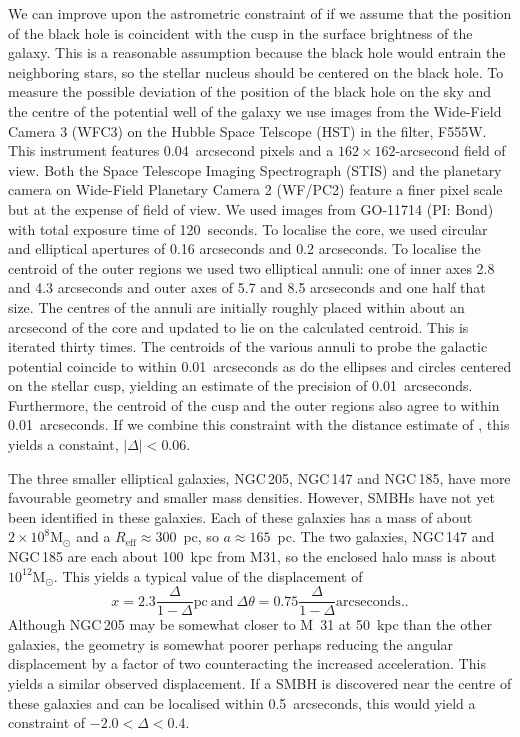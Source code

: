 \documentclass[useAMS,usenatbib]{mn2e}
\newcommand{\msun}{\mathrm{M}_\odot}
\begin{document}
We can improve upon the astrometric constraint of
\citet{2015arXiv150203231Y} if we assume that the position of the
black hole is coincident with the cusp in the surface brightness of
the galaxy.  This is a reasonable assumption because the black hole
would entrain the neighboring stars, so the stellar nucleus should be
centered on the black hole. To measure the possible deviation of the
position of the black hole on the sky and the centre of the potential
well of the galaxy we use images from the Wide-Field Camera 3 (WFC3)
on the Hubble Space Telscope (HST) in the filter, F555W.  This
instrument features 0.04~arcsecond pixels and a $162 \times
162$-arcsecond field of view.  Both the Space Telescope Imaging
Spectrograph (STIS) and the planetary camera on Wide-Field Planetary
Camera 2 (WF/PC2) feature a finer pixel scale but at the expense of
field of view.  We used images from GO-11714 (PI: Bond) with total
exposure time of 120~seconds.  To localise the core, we used circular
and elliptical apertures of 0.16 arcseconds and 0.2 arcseconds.  To
localise the centroid of the outer regions we used two elliptical
annuli: one of inner axes 2.8 and 4.3 arcseconds and outer axes of 5.7
and 8.5 arcseconds and one half that size.  The centres of the annuli
are initially roughly placed within about an arcsecond of the core and
updated to lie on the calculated centroid. This is iterated thirty
times.  The centroids of the various annuli to probe the galactic
potential coincide to within 0.01~arcseconds as do the ellipses and
circles centered on the stellar cusp, yielding an estimate of the
precision of 0.01~arcseconds.  Furthermore, the centroid of the cusp
and the outer regions also agree to within 0.01~arcseconds.  If we
combine this constraint with the distance estimate of
\citet{2006AJ....131.1405K}, this yields a constaint, $|\Delta|<
0.06$.

The three smaller elliptical galaxies, NGC\,205, NGC\,147 and NGC\,185,
have more favourable geometry and smaller mass densities.  However,
SMBHs have not yet been identified in these galaxies.  Each of these
galaxies has a mass of about $2 \times 10^8 \msun$ and a
$R_\mathrm{eff} \approx 300$~pc, so $a \approx 165$~pc.  The two
galaxies, NGC\,147 and NGC\,185 are each about 100~kpc from M31, so the
enclosed halo mass is about $10^{12} \msun$.  This yields a
typical value of the displacement of
\begin{equation}
  x = 2.3 \frac{\Delta}{1-\Delta} \mathrm{pc} ~\mathrm{and}~
  \Delta \theta = 0.75 \frac{\Delta}{1-\Delta} \mathrm{arcseconds}.
  \label{eq:12}.
\end{equation}
Although NGC\,205 may be somewhat closer to M~31 at 50~kpc than the
other galaxies, the geometry is somewhat poorer perhaps reducing the
angular displacement by a factor of two counteracting the increased
acceleration.  This yields a similar observed displacement.  If a SMBH
is discovered near the centre of these galaxies and can be localised
within 0.5~arcseconds, this would yield a constraint of $-2.0 < \Delta
< 0.4$.
\end{document}
